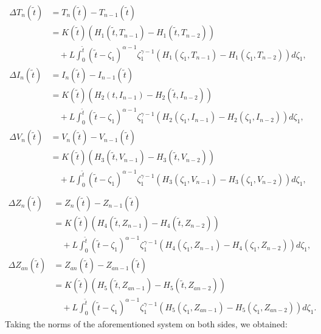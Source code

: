 \documentclass[10pt,a4paper]{amsart}
\numberwithin{equation}{section}
\begin{document}
\begin{align*}
	\Delta T_{n}(\tilde{t}) &= T_{n}(\tilde{t}) - T_{n-1}(\tilde{t}) \\
	&= K(\tilde{t}) \left( H_1(\tilde{t}, T_{n-1}) - H_1(\tilde{t}, T_{n-2}) \right) \\
	&\quad + L \int_0^{\tilde{t}} (\tilde{t}-\zeta_1)^{\alpha-1} \zeta_1^{\gamma-1} \left( H_1(\zeta_1, T_{n-1}) - H_1(\zeta_1, T_{n-2}) \right) d\zeta_1, \\[10pt]
	\Delta I_{n}(\tilde{t}) &= I_{n}(\tilde{t}) - I_{n-1}(\tilde{t}) \\
	&= K(\tilde{t}) \left( H_2(t, I_{n-1}) - H_2(\tilde{t}, I_{n-2}) \right) \\
	&\quad + L \int_0^{\tilde{t}} (\tilde{t}-\zeta_1)^{\alpha-1} \zeta_1^{\gamma-1} \left( H_2(\zeta_1, I_{n-1}) - H_2(\zeta_1, I_{n-2}) \right) d\zeta_1, \\[10pt]
	\Delta V_{n}(\tilde{t}) &= V_{n}(\tilde{t}) - V_{n-1}(\tilde{t}) \\
	&= K(\tilde{t}) \left( H_3(\tilde{t}, V_{n-1}) - H_3(\tilde{t}, V_{n-2}) \right) \\
	&\quad + L \int_0^{\tilde{t}} (\tilde{t}-\zeta_1)^{\alpha-1} \zeta_1^{\gamma-1} \left( H_3(\zeta_1, V_{n-1}) - H_3(\zeta_1, V_{n-2}) \right) d\zeta_1, \\[10pt]
\end{align*}
   \begin{align*} 
	\Delta Z_{n}(\tilde{t}) &= Z_{n}(\tilde{t}) - Z_{n-1}(\tilde{t}) \\
	&= K(\tilde{t}) \left( H_4(\tilde{t}, Z_{n-1}) - H_4(\tilde{t}, Z_{n-2}) \right) \\
	&\quad + L \int_0^{\tilde{t}} (\tilde{t}-\zeta_1)^{\alpha-1} \zeta_1^{\gamma-1} \left( H_4(\zeta_1, Z_{n-1}) - H_4(\zeta_1, Z_{n-2}) \right) d\zeta_1, \\[10pt]
	\Delta Z_{an}(\tilde{t}) &= Z_{an}(\tilde{t}) - Z_{an-1}(\tilde{t}) \\
	&= K(\tilde{t}) \left( H_5(\tilde{t}, Z_{an-1}) - H_5(\tilde{t}, Z_{an-2}) \right) \\
	&\quad + L \int_0^{\tilde{t}} (\tilde{t}-\zeta_1)^{\alpha-1} \zeta_1^{\gamma-1} \left( H_5(\zeta_1, Z_{an-1}) - H_5(\zeta_1, Z_{an-2}) \right) d\zeta_1.
\end{align*}
Taking the norms of the aforementioned system on both sides, we obtained:
\end{document}

